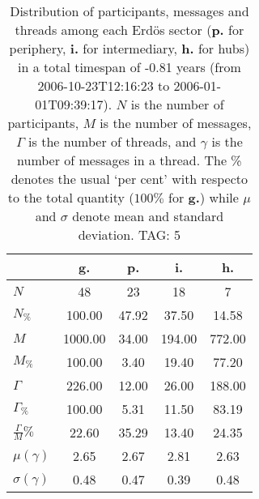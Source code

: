 \begin{table}[h!]
\begin{center}
\begin{tabular}{| l || c | c | c | c |}\hline
 & {\bf g.} & {\bf p.} & {\bf i.} & {\bf h.} \\\hline\hline
$N$ & 48  & 23  & 18  & 7 \\
$N_{\%}$ & 100.00  & 47.92  & 37.50  & 14.58 \\\hline
$M$ & 1000.00  & 34.00  & 194.00  & 772.00 \\
$M_{\%}$ & 100.00  & 3.40  & 19.40  & 77.20 \\\hline
$\Gamma$ & 226.00  & 12.00  & 26.00  & 188.00 \\
$\Gamma_{\%}$ & 100.00  & 5.31  & 11.50  & 83.19 \\\hline
$\frac{\Gamma}{M}\%$ & 22.60  & 35.29  & 13.40  & 24.35 \\
$\mu(\gamma)$ & 2.65  & 2.67  & 2.81  & 2.63 \\
$\sigma(\gamma)$ & 0.48  & 0.47  & 0.39  & 0.48 \\\hline
\end{tabular}
\caption{Distribution of participants, messages and threads among each Erd\"os sector ({\bf p.} for periphery, {\bf i.} for intermediary, 
    {\bf h.} for hubs) in a total timespan of -0.81 years (from 2006-10-23T12:16:23 to 2006-01-01T09:39:17). $N$ is the number of participants, $M$ is the number of messages, $\Gamma$ is the number of threads, and $\gamma$ is the number of messages in a thread.
    The \% denotes the usual `per cent' with respecto to the total quantity ($100\%$ for {\bf g.})
    while $\mu$ and $\sigma$ denote mean and standard deviation. TAG: 5}
\end{center}
\end{table}